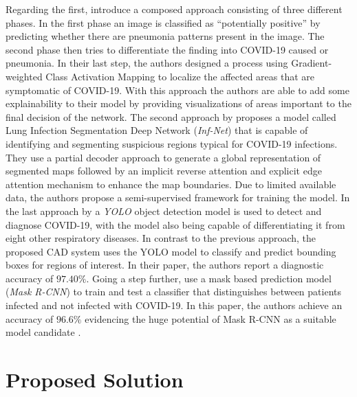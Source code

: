 Regarding the first, \citeauthor{brunese2020explainable} \autocite{brunese2020explainable} introduce a composed approach consisting of three different phases. In the first phase an image is classified as \enquote{potentially positive} by predicting whether there are pneumonia patterns present in the image. The second phase then tries to differentiate the finding into COVID-19 caused or pneumonia. In their last step, the authors designed a process using Gradient-weighted Class Activation Mapping to localize the affected areas that are symptomatic of COVID-19. With this approach the authors are able to add some explainability to their model by providing visualizations of areas important to the final decision of the network.\newline
The second approach by \citeauthor{fan2020inf} \autocite{fan2020inf} proposes a model called Lung Infection Segmentation Deep Network (\textit{Inf-Net}) that is capable of identifying and segmenting suspicious regions typical for COVID-19 infections. They use a partial decoder approach to generate a global representation of segmented maps followed by an implicit reverse attention and explicit edge attention mechanism to enhance the map boundaries. Due to limited available data, the authors propose a semi-supervised framework for training the model.\newline
In the last approach by \citeauthor{al2021fast} \autocite{al2021fast} a \textit{\ac{YOLO}} object detection model \autocite{yoloOriginal} is used to detect and diagnose COVID-19, with the model also being capable of differentiating it from eight other respiratory diseases. In contrast to the previous approach, the proposed \ac{CAD} system uses the \ac{YOLO} model to classify and predict bounding boxes for regions of interest. In their paper, the authors report a diagnostic accuracy of $97.40\%$.
Going a step further, \citeauthor{podder_efficient_2021} use a mask based prediction model (\textit{Mask \ac{R-CNN}}) to train and test a classifier that distinguishes between patients infected and not infected with COVID-19. In this paper, the authors achieve an accuracy of $96.6\%$ evidencing the huge potential of Mask \ac{R-CNN} as a suitable model candidate \autocite{podder_efficient_2021}.




\section{Proposed Solution}

